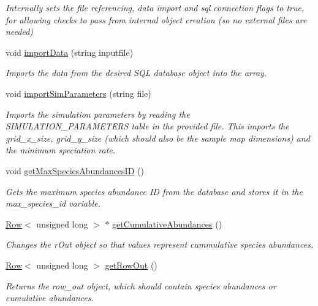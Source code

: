 \begin{DoxyCompactItemize}
\begin{DoxyCompactList}\small\item\em Internally sets the file referencing, data import and sql connection flags to true, for allowing checks to pass from internal object creation (so no external files are needed) \end{DoxyCompactList}\item 
void \hyperlink{group___community_objects_a85db7255d3a1d53509ed2800fc24de31}{import\+Data} (string inputfile)
\begin{DoxyCompactList}\small\item\em Imports the data from the desired S\+QL database object into the array. \end{DoxyCompactList}\item 
void \hyperlink{group___community_objects_a548d36e99e592f0bfc09c8315b27f8bb}{import\+Sim\+Parameters} (string file)
\begin{DoxyCompactList}\small\item\em Imports the simulation parameters by reading the S\+I\+M\+U\+L\+A\+T\+I\+O\+N\+\_\+\+P\+A\+R\+A\+M\+E\+T\+E\+RS table in the provided file. This imports the grid\+\_\+x\+\_\+size, grid\+\_\+y\+\_\+size (which should also be the sample map dimensions) and the minimum speciation rate. \end{DoxyCompactList}\item 
void \hyperlink{group___community_objects_a8ac0ce642595283f342c2f1841f4c20f}{get\+Max\+Species\+Abundances\+ID} ()
\begin{DoxyCompactList}\small\item\em Gets the maximum species abundance ID from the database and stores it in the max\+\_\+species\+\_\+id variable. \end{DoxyCompactList}\item 
\hyperlink{class_row}{Row}$<$ unsigned long $>$ $\ast$ \hyperlink{group___community_objects_a51d90183f6a26e7d192abfd748945f2b}{get\+Cumulative\+Abundances} ()
\begin{DoxyCompactList}\small\item\em Changes the r\+Out object so that values represent cummulative species abundances. \end{DoxyCompactList}\item 
\hyperlink{class_row}{Row}$<$ unsigned long $>$ \hyperlink{group___community_objects_a63fd8d32af6d52d009d1fd54098e4594}{get\+Row\+Out} ()
\begin{DoxyCompactList}\small\item\em Returns the row\+\_\+out object, which should contain species abundances or cumulative abundances. \end{DoxyCompactList}\item 

\end{DoxyCompactItemize}
